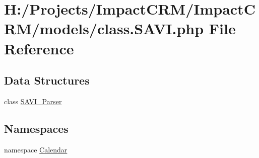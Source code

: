 \hypertarget{class_8SAVI_8php}{
\section{H:/Projects/ImpactCRM/ImpactCRM/models/class.SAVI.php File Reference}
\label{class_8SAVI_8php}
}
\subsection*{Data Structures}
\begin{DoxyCompactItemize}
\item 
class \hyperlink{classSAVI__Parser}{SAVI\_\-Parser}
\end{DoxyCompactItemize}
\subsection*{Namespaces}
\begin{DoxyCompactItemize}
\item 
namespace \hyperlink{namespaceCalendar}{Calendar}
\end{DoxyCompactItemize}
